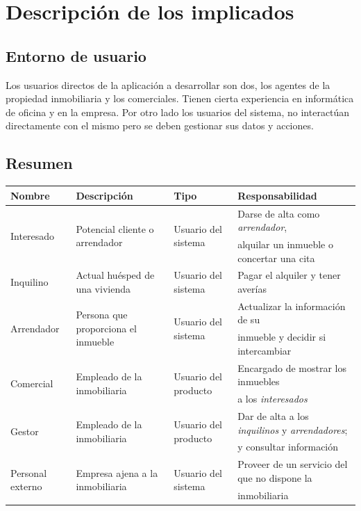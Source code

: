 \documentclass[10pt,a4paper]{article}
\begin{document}
\section{Descripción de los implicados}
\subsection*{Entorno de usuario}
Los usuarios directos de la aplicación a desarrollar son dos, los agentes de la propiedad inmobiliaria y los comerciales. Tienen cierta experiencia en informática de oficina y en la empresa. Por otro lado los usuarios del sistema, no interactúan directamente con el mismo pero se deben gestionar sus datos y acciones.
\subsection*{Resumen}
{\footnotesize
\begin{tabular}{|l|l|l|l|}
\hline
{\small\textbf{Nombre}} & {\small\textbf{Descripción}} & {\small\textbf{Tipo}} & {\small\textbf{Responsabilidad}}\\ \hline
\multirow{2}{*}{Interesado} & \multirow{2}{*}{Potencial cliente o arrendador} & \multirow{2}{*}{Usuario del sistema} & Darse de alta como \textit{arrendador}, \\
 & & &  alquilar un inmueble o concertar una cita \\ \hline
Inquilino  & Actual huésped de una vivienda & Usuario del sistema & Pagar el alquiler y tener averías \\ \hline
\multirow{2}{*}{Arrendador} & \multirow{2}{*}{Persona que proporciona el inmueble} & \multirow{2}{*}{Usuario del sistema} & Actualizar la información de su \\
 & & &  inmueble y decidir si intercambiar \\ \hline
\multirow{2}{*}{Comercial} & \multirow{2}{*}{Empleado de la inmobiliaria} & \multirow{2}{*}{Usuario del producto} & Encargado de mostrar los inmuebles\\
 & & &  a los \textit{interesados} \\ \hline
\multirow{2}{*}{Gestor} & \multirow{2}{*}{Empleado de la inmobiliaria} & \multirow{2}{*}{Usuario del producto} & Dar de alta a los \textit{inquilinos} y \textit{arrendadores}; \\
 & & &  y consultar información \\ \hline
 \multirow{2}{*}{Personal externo} & \multirow{2}{*}{Empresa ajena a la inmobiliaria} & \multirow{2}{*}{Usuario del sistema} & Proveer de un servicio del que no dispone la \\
 & & & inmobiliaria \\ \hline
\end{tabular}}
\end{document}
